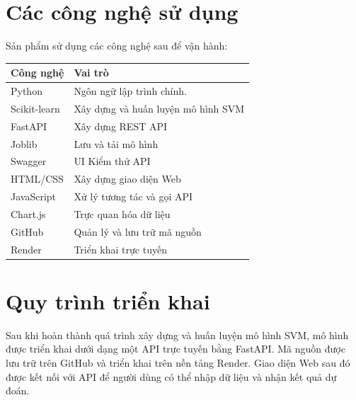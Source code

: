 \documentclass[12pt,a4paper]{report}
\begin{document}
	\section{Các công nghệ sử dụng}
	
	Sản phẩm sử dụng các công nghệ sau để vận hành:
	
	
	\begin{table}[H]
		\centering
		\label{tab:congnghe}
		\begin{tabular}{|p{6.2cm}|p{6.2cm}|}
			\hline
			\textbf{Công nghệ} & \textbf{Vai trò} \\  
			\hline
			
			Python 
			& Ngôn ngữ lập trình chính. \\
			\hline
		
			
			Scikit-learn
			& Xây dựng và huấn luyện mô hình SVM \\
			\hline
			
		
			
			FastAPI
			& Xây dựng REST API \\
			\hline
			
			
			Joblib
			& Lưu và tải mô hình \\
			\hline
			
			Swagger
			& UI	Kiểm thử API \\
			\hline

			
			HTML/CSS
			& Xây dựng giao diện Web \\		
			\hline
			
			JavaScript
			& Xử lý tương tác và gọi API \\
			\hline
			
			Chart.js
			& Trực quan hóa dữ liệu\\
			\hline
				
			GitHub
			& Quản lý và lưu trữ mã nguồn \\
			\hline
			
			Render
			& Triển khai trực tuyến \\		
			\hline
		\end{tabular}
	\end{table}
	
	
	\section{Quy trình triển khai}

	
	Sau khi hoàn thành quá trình xây dựng và huấn luyện mô hình SVM, mô hình được triển khai dưới dạng một API trực tuyến bằng FastAPI. Mã nguồn được lưu trữ trên GitHub và triển khai trên nền tảng Render. Giao diện Web sau đó được kết nối với API để người dùng có thể nhập dữ liệu và nhận kết quả dự đoán.
	
\end{document}

